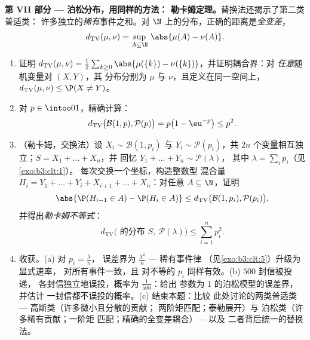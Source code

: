 \begin{problem}
\medskip
\noindent\textbf{第 VII 部分 --- 泊松分布，用同样的方法：
勒卡姆定理。}替换法还揭示了第二类普适类：
许多独立的\emph{稀有}事件之和。对
$\N$ 上的分布，正确的距离是\emph{全变差}，
\[
d_{\mathrm{TV}}(\mu, \nu) = \sup_{A\subseteq\N}\,
\abs{\mu(A) - \nu(A)} .
\]
\begin{enumerate}[resume]
  \item 证明 $d_{\mathrm{TV}}(\mu, \nu) =
        \frac12\sum_{k\geq0}\abs{\mu(\{k\}) -
        \nu(\{k\})}$，并证明耦合界：对
        \emph{任意}随机变量对 $(X, Y)$，其
        分布分别为 $\mu$ 与 $\nu$，且定义在同一空间上，
        $d_{\mathrm{TV}}(\mu, \nu) \leq \P(X \neq Y)$。
  \item 对 $p \in \intoo01$，精确计算：
        \[
        d_{\mathrm{TV}}\bigl(\mathcal B(1, p), \mathcal
        P(p)\bigr) = p\bigl(1 - \eu^{-p}\bigr) \leq p^2 .
        \]
  \item （勒卡姆，交换法）设 $X_i \sim \mathcal B(1,
        p_i)$ 与 $Y_i \sim \mathcal P(p_i)$，共 $2n$
        个变量相互独立；$S = X_1 + \dots + X_n$，并
        回忆 $Y_1 + \dots + Y_n \sim \mathcal P(\lambda)$，
        其中 $\lambda = \sum_ip_i$（见\cref{exo:b3:clt:1}）。
        每次交换一个坐标，构造整数型
        混合量 $H_i = Y_1 + \dots + Y_i + X_{i+1} + \dots
        + X_n$：对任意 $A \subseteq \N$，证明
        \[
        \abs{\P(H_{i-1} \in A) - \P(H_i \in A)} \leq
        d_{\mathrm{TV}}\bigl(\mathcal B(1, p_i), \mathcal
        P(p_i)\bigr),
        \]
        并得出\emph{勒卡姆不等式}：
        \[
        d_{\mathrm{TV}}\bigl(\text{ 的分布 } S,\ \mathcal
        P(\lambda)\bigr) \leq \sum_{i=1}^np_i^2 .
        \]
  \item 收获。(a) 对 $p_i = \frac\lambda n$，
        误差界为 $\frac{\lambda^2}n$ --- 稀有事件律
        （见\cref{exo:b3:clt:5}）升级为显式速率，
        对所有事件一致，且
        对不等的 $p_i$ 同样有效。(b) $500$ 封信被投递，
        各封信独立地误投，概率为
        $\frac1{500}$：给出
        参数为 $1$ 的泊松模型的误差界，并估计
        一封信都不误投的概率。(c) 结束本题：比较
        此处讨论的两类普适类 ---
        高斯类（许多微小且分散的贡献；
        两阶矩匹配；泰勒展开）与
        泊松类（许多稀有贡献；一阶矩
        匹配；精确的全变差耦合）--- 以及
        二者背后统一的替换法。


\end{enumerate}
\end{problem}
